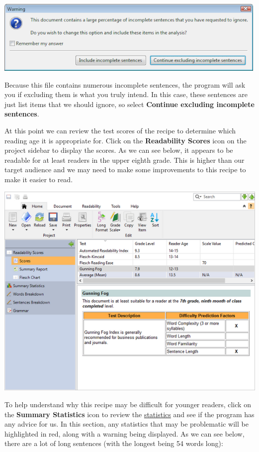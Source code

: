\documentclass[
]{book}
\theoremstyle{definition}
\theoremstyle{definition}
\theoremstyle{definition}
\theoremstyle{definition}
\theoremstyle{remark}
\begin{document}
\begin{center}\includegraphics[width=0.5\linewidth,]{Images/NonGenerated/sentencewarning} \end{center}

Because this file contains numerous incomplete sentences, the program will ask you if excluding them is what you truly intend. In this case, these sentences are just list items that we should ignore, so select \textbf{Continue excluding incomplete sentences}.

At this point we can review the test scores of the recipe to determine which reading age it is appropriate for. Click on the \textbf{Readability Scores} icon on the project sidebar to display the scores. As we can see below, it appears to be readable for at least readers in the upper eighth grade. This is higher than our target audience and we may need to make some improvements to this recipe to make it easier to read.

\includegraphics{Images/testscores.png}

To help understand why this recipe may be difficult for younger readers, click on the \textbf{Summary Statistics} icon to review the \protect\hyperlink{reviewing-statistics}{statistics} and see if the program has any advice for us. In this section, any statistics that may be problematic will be highlighted in red, along with a warning being displayed. As we can see below, there are a lot of long sentences (with the longest being 54 words long):
\end{document}
